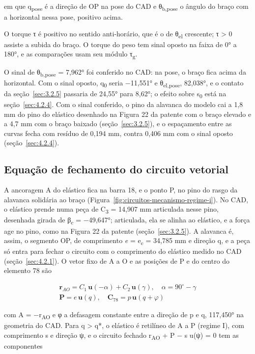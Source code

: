 em que q\textsubscript{pose} é a direção de OP na pose do CAD e θ\textsubscript{b,pose} o ângulo do braço com a horizontal nessa pose, positivo acima.

O torque τ é positivo no sentido anti-horário, que é o de θ\textsubscript{el} crescente; τ > 0 assiste a subida do braço. O torque do peso tem sinal oposto na faixa de 0° a 180°, e as comparações usam seu módulo τ\textsubscript{g}.

O sinal de θ\textsubscript{b,pose} = 7,962° foi conferido no CAD: na pose, o braço fica acima da horizontal. Com o sinal oposto, q\textsubscript{0} seria −11,551° e θ\textsubscript{el,pose}, 82,038°, e o contato da seção~\ref{sec:3.2.5} passaria de 24,55° para 8,62°; o efeito sobre s\textsubscript{0} está na seção~\ref{sec:4.2.4}. Com o sinal conferido, o pino da alavanca do modelo cai a 1,8 mm do pino do elástico desenhado na Figura 22 da patente com o braço elevado e a 4,7 mm com o braço baixado (seção~\ref{sec:3.2.5}), e o espaçamento entre as curvas fecha com resíduo de 0,194 mm, contra 0,406 mm com o sinal oposto (seção~\ref{sec:4.2.4}).

\subsection{Equação de fechamento do circuito vetorial}\label{sec:3.2.4}

A ancoragem A do elástico fica na barra 18, e o ponto P, no pino do rasgo da alavanca solidária ao braço (Figura~\ref{fig:circuitos-mecanismo-regime-i}). No CAD, o elástico prende numa peça de C\textsubscript{3} = 14,907 mm articulada nesse pino, desenhada girada de β\textsubscript{c} = −49,647°; articulada, ela se alinha ao elástico, e a força age no pino, como na Figura 22 da patente (seção~\ref{sec:3.2.5}). A alavanca é, assim, o segmento OP, de comprimento \textit{e} = e\textsubscript{c} = 34,785 mm e direção q, e a peça só entra para fechar o circuito com o comprimento do elástico medido no CAD (seção~\ref{sec:4.2.1}). O vetor fixo de A a O e as posições de P e do centro do elemento 78 são

\begin{gather}
  \mathbf{r}_{AO} = C_{1}\,\mathbf{u}( - \alpha) + C_{2}\,\mathbf{u}(\gamma),\quad\alpha = 90^{\circ} - \gamma \label{eq:34} \\
  \mathbf{P} = e\,\mathbf{u}(q),\quad\mathbf{C}_{78} = p\,\mathbf{u}(q + \varphi) \label{eq:35}
\end{gather}

com A = −r\textsubscript{AO} e φ a defasagem constante entre a direção de p e q, 117,450° na geometria do CAD. Para q > q*, o elástico é retilíneo de A a P (regime I), com comprimento s e direção ψ, e o circuito fechado r\textsubscript{AO} + P − s u(ψ) = 0 tem as componentes

